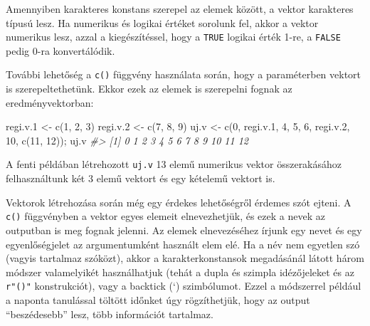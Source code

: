 \documentclass[
]{book}
\newenvironment{Shaded}{\begin{snugshade}}{\end{snugshade}}
\newcommand{\CommentTok}[1]{\textcolor[rgb]{0.56,0.35,0.01}{\textit{#1}}}
\newcommand{\DecValTok}[1]{\textcolor[rgb]{0.00,0.00,0.81}{#1}}
\newcommand{\FloatTok}[1]{\textcolor[rgb]{0.00,0.00,0.81}{#1}}
\newcommand{\FunctionTok}[1]{\textcolor[rgb]{0.00,0.00,0.00}{#1}}
\newcommand{\NormalTok}[1]{#1}
\newcommand{\OtherTok}[1]{\textcolor[rgb]{0.56,0.35,0.01}{#1}}
\begin{document}
Amennyiben karakteres konstans szerepel az elemek között, a vektor karakteres típusú lesz. Ha numerikus és logikai értéket sorolunk fel, akkor a vektor numerikus lesz, azzal a kiegészítéssel, hogy a \texttt{TRUE} logikai érték 1-re, a \texttt{FALSE} pedig 0-ra konvertálódik.

További lehetőség a \texttt{c()} függvény használata során, hogy a paraméterben vektort is szerepeltethetünk. Ekkor ezek az elemek is szerepelni fognak az eredményvektorban:

\begin{Shaded}
\begin{Highlighting}[]
\NormalTok{regi.v}\FloatTok{.1} \OtherTok{\textless{}{-}} \FunctionTok{c}\NormalTok{(}\DecValTok{1}\NormalTok{, }\DecValTok{2}\NormalTok{, }\DecValTok{3}\NormalTok{)}
\NormalTok{regi.v}\FloatTok{.2} \OtherTok{\textless{}{-}} \FunctionTok{c}\NormalTok{(}\DecValTok{7}\NormalTok{, }\DecValTok{8}\NormalTok{, }\DecValTok{9}\NormalTok{)}
\NormalTok{uj.v }\OtherTok{\textless{}{-}} \FunctionTok{c}\NormalTok{(}\DecValTok{0}\NormalTok{, regi.v}\FloatTok{.1}\NormalTok{, }\DecValTok{4}\NormalTok{, }\DecValTok{5}\NormalTok{, }\DecValTok{6}\NormalTok{, regi.v}\FloatTok{.2}\NormalTok{, }\DecValTok{10}\NormalTok{, }\FunctionTok{c}\NormalTok{(}\DecValTok{11}\NormalTok{, }\DecValTok{12}\NormalTok{)); uj.v}
\CommentTok{\#\textgreater{}  [1]  0  1  2  3  4  5  6  7  8  9 10 11 12}
\end{Highlighting}
\end{Shaded}

A fenti példában létrehozott \texttt{uj.v} 13 elemű numerikus vektor összerakásához felhasználtunk két 3 elemű vektort és egy kételemű vektort is.

Vektorok létrehozása során még egy érdekes lehetőségről érdemes szót ejteni. A \texttt{c()} függvényben a vektor egyes elemeit elnevezhetjük, és ezek a nevek az outputban is meg fognak jelenni. Az elemek elnevezéséhez írjunk egy nevet és egy egyenlőségjelet az argumentumként használt elem elé. Ha a név nem egyetlen szó (vagyis tartalmaz szóközt), akkor a karakterkonstansok megadásánál látott három módszer valamelyikét használhatjuk (tehát a dupla és szimpla idézőjeleket és az \texttt{r"()"} konstrukciót), vagy a backtick (`) szimbólumot. Ezzel a módszerrel például a naponta tanulással töltött időnket úgy rögzíthetjük, hogy az output ``beszédesebb'' lesz, több információt tartalmaz.
\end{document}
